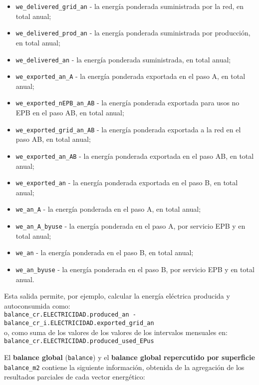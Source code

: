 \documentclass[10pt,notitlepage,oneside,a4paper]{article}
\begin{document}
\begin{itemize}
\item \texttt{we\_delivered\_grid\_an} - la energía ponderada suministrada por la red, en total anual;
\item \texttt{we\_delivered\_prod\_an} - la energía ponderada suministrada por producción, en total anual;
\item \texttt{we\_delivered\_an} - la energía ponderada suministrada, en total anual;
\item \texttt{we\_exported\_an\_A} - la energía ponderada exportada en el paso A, en total anual;
\item \texttt{we\_exported\_nEPB\_an\_AB} - la energía ponderada exportada para usos no EPB en el paso AB, en total anual;
\item \texttt{we\_exported\_grid\_an\_AB} - la energía ponderada exportada a la red en el paso AB, en total anual;
\item \texttt{we\_exported\_an\_AB} - la energía ponderada exportada en el paso AB, en total anual;
\item \texttt{we\_exported\_an} - la energía ponderada exportada en el paso B, en total anual;
\item \texttt{we\_an\_A} - la energía ponderada en el paso A, en total anual;
\item \texttt{we\_an\_A\_byuse} - la energía ponderada en el paso A, por servicio EPB y en total anual;
\item \texttt{we\_an} - la energía ponderada en el paso B, en total anual;
\item \texttt{we\_an\_byuse} - la energía ponderada en el paso B, por servicio EPB y en total anual.
\end{itemize}

\begin{myquote}\small
Esta salida permite, por ejemplo, calcular la energía eléctrica producida y autoconsumida como:
\\

\texttt{balance\_cr.ELECTRICIDAD.produced\_an - balance\_cr\_i.ELECTRICIDAD.exported\_grid\_an}
\\

o, como suma de los valores de los valores de los intervalos mensuales en:
\\

\texttt{balance\_cr.ELECTRICIDAD.produced\_used\_EPus}
\end{myquote}

El \textbf{balance global} (\texttt{balance}) y el \textbf{balance global repercutido por superficie} \texttt{balance\_m2} contiene la siguiente información, obtenida de la agregación de los resultados parciales de cada vector energético:
\end{document}
